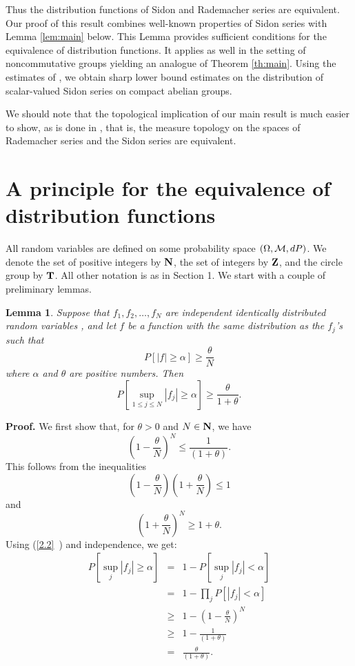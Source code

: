 Thus the distribution functions of Sidon and Rademacher series are
equivalent.  Our proof of this result combines well-known properties
of Sidon series with Lemma \ref{lem:main} below.
This Lemma provides sufficient conditions for the
equivalence
of distribution functions.  It applies as well in the setting of
noncommutative groups yielding an analogue of Theorem \ref{th:main}.
Using
the estimates of \cite{bib:Mo1}, we obtain sharp lower
bound
estimates on the distribution of scalar-valued Sidon series on compact
abelian groups.

We should note that the topological implication of our main result is
much easier to show, as is done in \cite{bib:Pi1}, that is, the 
measure topology on the spaces of Rademacher series and the Sidon series
are equivalent.


\section{A principle for the equivalence of distribution functions}

All random variables are defined on some probability space $(\Omega ,
{\cal M}, dP)$.  We denote the set of positive integers by ${\hbox{\bf N}}$, the set
of integers by ${\hbox{\bf Z}}$, and the circle group by ${\hbox{\bf T}}$.
All other notation is as in Section 1.  We start with a
couple of preliminary lemmas.

\newtheorem{lem:1}{Lemma}[section]
\begin{lem:1}
Suppose that $f_1 , f_2, \ldots, f_N$ are independent identically
distributed random variables , and let $f$ be a function with the same
distribution as the $f_j$'s such that
$$
P[ |f| \geq \alpha ] \geq \frac{\theta}{N}
$$
where $\alpha$ and $\theta$ are positive numbers.  Then
$$
P[ \sup_{1\leq j\leq N}|f_j| \geq \alpha ]
\geq
\frac{\theta}{1 + \theta}.$$

\label{lem:1}
\end{lem:1}

{\bf Proof.}  We first show that, for $\theta > 0$ and $N \in {\hbox{\bf N}}$,
we have
\begin{equation}
 (1 - \frac{\theta }{N})^N \leq \frac{1}{(1 +
\theta )}.
\label{2.2}
\end{equation}
This follows from the inequalities
$$(1 - \frac{\theta }{N})(1 + \frac{\theta }{N}) \leq 1$$
and
$$(1 + \frac{\theta }{N})^N \geq 1 + \theta .$$
Using (\ref{2.2}\ ) and independence, we get:
\begin{eqnarray*}
P[\sup_j |f_j| \geq \alpha ]     & = &   1 - P[\sup_j |f_j| < \alpha ] \\
                                 & = &   1 -\prod_j P[|f_j| < \alpha ] \\
                                & \geq &  1 - (1 -\frac{\theta}{N})^N \\
                                & \geq &  1 - \frac{1}{(1 + \theta )} \\
                                & = &   \frac{\theta}{(1 + \theta )}.
\end{eqnarray*}




